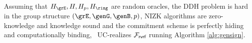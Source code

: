 

\begin{theorem}
	Assuming that $ \hashG, \hash,\hash_p, \hash_\ring $ are random oracles,  the DDH problem is hard in the group structure $ (\GG, \genG,\genB, p) $, NIZK algorithms are zero-knowledge and knowledge sound and the commitment scheme is perfectly hiding and computationally binding, \name \ UC-realizes $\mathcal{F}_{\textsf{rvrf}}$ running Algorithm \ref{alg:gensign}.
\end{theorem}

